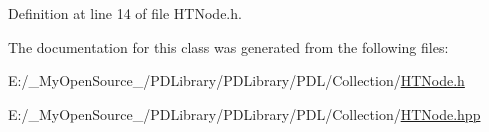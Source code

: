 Definition at line 14 of file H\+T\+Node.\+h.



The documentation for this class was generated from the following files\+:\begin{DoxyCompactItemize}
\item 
E\+:/\+\_\+\+My\+Open\+Source\+\_\+/\+P\+D\+Library/\+P\+D\+Library/\+P\+D\+L/\+Collection/\mbox{\hyperlink{_h_t_node_8h}{H\+T\+Node.\+h}}\item 
E\+:/\+\_\+\+My\+Open\+Source\+\_\+/\+P\+D\+Library/\+P\+D\+Library/\+P\+D\+L/\+Collection/\mbox{\hyperlink{_h_t_node_8hpp}{H\+T\+Node.\+hpp}}\end{DoxyCompactItemize}
